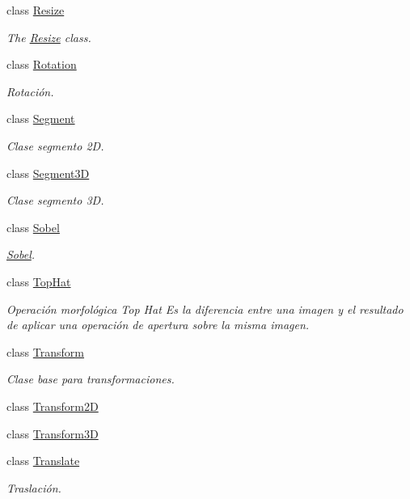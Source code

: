 \begin{DoxyCompactItemize}
class \hyperlink{class_i3_d_1_1_resize}{Resize}
\begin{DoxyCompactList}\small\item\em The \hyperlink{class_i3_d_1_1_resize}{Resize} class. \end{DoxyCompactList}\item 
class \hyperlink{class_i3_d_1_1_rotation}{Rotation}
\begin{DoxyCompactList}\small\item\em Rotación. \end{DoxyCompactList}\item 
class \hyperlink{class_i3_d_1_1_segment}{Segment}
\begin{DoxyCompactList}\small\item\em Clase segmento 2D. \end{DoxyCompactList}\item 
class \hyperlink{class_i3_d_1_1_segment3_d}{Segment3D}
\begin{DoxyCompactList}\small\item\em Clase segmento 3D. \end{DoxyCompactList}\item 
class \hyperlink{class_i3_d_1_1_sobel}{Sobel}
\begin{DoxyCompactList}\small\item\em \hyperlink{class_i3_d_1_1_sobel}{Sobel}. \end{DoxyCompactList}\item 
class \hyperlink{class_i3_d_1_1_top_hat}{Top\+Hat}
\begin{DoxyCompactList}\small\item\em Operación morfológica Top Hat Es la diferencia entre una imagen y el resultado de aplicar una operación de apertura sobre la misma imagen. \end{DoxyCompactList}\item 
class \hyperlink{class_i3_d_1_1_transform}{Transform}
\begin{DoxyCompactList}\small\item\em Clase base para transformaciones. \end{DoxyCompactList}\item 
class \hyperlink{class_i3_d_1_1_transform2_d}{Transform2D}
\item 
class \hyperlink{class_i3_d_1_1_transform3_d}{Transform3D}
\item 
class \hyperlink{class_i3_d_1_1_translate}{Translate}
\begin{DoxyCompactList}\small\item\em Traslación. \end{DoxyCompactList}\item 

\end{DoxyCompactItemize}
